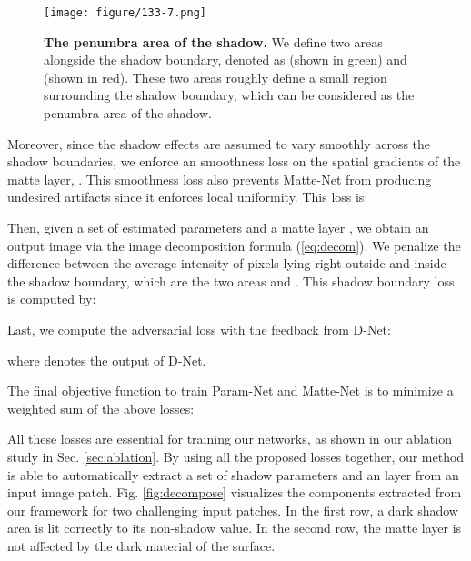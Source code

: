 \documentclass[runningheads]{llncs}
\begin{document}
\def\subboxsize{0.31\textwidth}
\begin{figure}[t!]
	\centering
  \texttt{[image: figure/133-7.png]}
    \makebox[\subboxsize]{Input Image}
    \makebox[\subboxsize]{Shadow Mask}
    \makebox[\subboxsize]{ (green) \&  (red)}

  \caption{\textbf{The penumbra area of the shadow.} We define two areas alongside the shadow boundary, denoted as  (shown in green) and  (shown in red). These two areas roughly define a small region surrounding the shadow boundary, which can be considered as the penumbra area of the shadow. }
  \label{fig:boundary}

\end{figure}

Moreover, since the shadow effects are assumed to vary smoothly across the shadow boundaries, we enforce an  smoothness loss on the spatial gradients of the matte layer, . This smoothness loss  also prevents Matte-Net from producing undesired artifacts since it enforces local uniformity. This loss is:



Then, given a set of estimated parameters  and a matte layer , we obtain an output image  via the image decomposition formula (\ref{eq:decom}). We penalize the  difference between the average intensity of pixels lying right outside and inside the shadow boundary, which are the two areas  and . This shadow boundary loss  is computed by:



Last, we compute the adversarial loss with the feedback from D-Net: 

where  denotes the output of D-Net.

The final objective function to train Param-Net and Matte-Net is to minimize a weighted sum of the above losses:


All these losses are essential for training our networks, as shown in our ablation study in Sec. \ref{sec:ablation}. By using all the proposed losses together, our method is able to automatically extract a set of shadow parameters and an  layer from an input image patch. 
Fig. \ref{fig:decompose} visualizes the components extracted from our framework for two challenging input patches. In the first row, a dark shadow area is lit correctly to its non-shadow value. In the second row, the matte layer  is not affected by the dark material of the surface.
\end{document}
